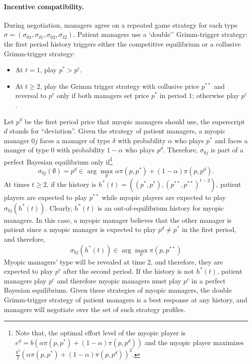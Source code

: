 \documentclass[]{article}
\begin{document}
\paragraph{Incentive compatibility.} During negotiation, managers agree on a repeated game strategy for each type  $\sigma=(\sigma_{01},\sigma_{\delta 1},\sigma_{02},\sigma_{\delta 2})$. Patient managers use a `double'' Grimm-trigger strategy: the first period history triggers either the competitive equilibrium or a collusive Grimm-trigger strategy:
\begin{itemize}
    \item At $t=1$, play $p^*>p^c$.
    \item At $t\geq 2$, play the Grimm trigger strategy with collusive price $p^{**}$ and reversal to $p^c$ only if both managers set price $p^*$ in period $1$; otherwise play $p^c$.
\end{itemize}
%
Let $p^d$ be the first period price that myopic managers should use, the superscript $d$ stands for ``deviation''. Given the strategy of patient managers, a myopic manager $0j$ faces a manager of type $\delta$ with probability $\alpha$ who plays $p^*$ and faces a manger of type $0$ with probability $1-\alpha$ who plays $p^d$. Therefore, $\sigma_{0j}$ is part of a perfect Bayesian equilibrium only if\footnote{Note that, the optimal effort level of the myopic player is $e^d = b (\alpha \pi(p,p^*) + (1-\alpha) \pi(p,p^d))$ and the myopic player maximizes $\frac{b^2}{2} (\alpha \pi(p,p^*) + (1-\alpha) \pi(p,p^d))^2$.}
%
\begin{equation}\label{pool:IC0}
\sigma_{0j}(\emptyset)=p^d \in \arg\max_{p} \alpha \pi(p,p^*)+(1-\alpha)\pi(p,p^d).
\end{equation}
%
At times $t\geq 2$, if the history is $h^*(t)=\left((p^*,p^*),(p^{**},p^{**})^{t-2}\right)$, patient players are expected to play 
$p^{**}$ while myopic players are expected to play $\sigma_{0j}(h^*(t))$. Clearly, $h^*(t)$ is an out-of-equilibrium history for myopic managers. In this case, a myopic manager believes that the other manager is patient since a myopic manager is expected to play $p^d\neq p^*$ in the first period, and therefore,
\[
\sigma_{0j}(h^*(t))\in \arg\max_{p} \pi(p,p^{**})
\]
Myopic managers' type will be revealed at time $2$, and therefore, they are expected to play $p^c$ after the second period. If the history is not $h^*(t)$, patient managers play $p^c$ and therefore myopic managers must play $p^c$ in a perfect Bayesian equilibrium. Given these strategies of myopic managers, the double Grimm-trigger strategy of patient managers is a best response at any history, and managers will negotiate over the set of such strategy profiles. 
\end{document}
